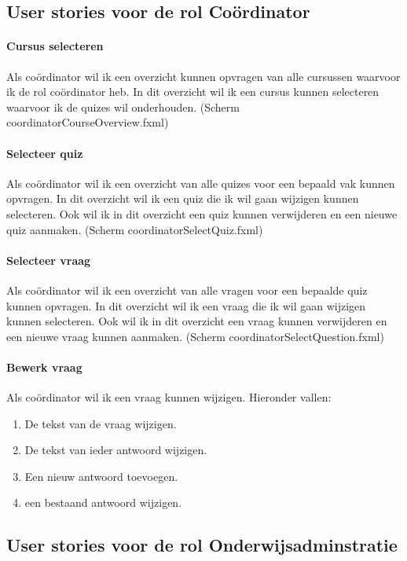 \documentclass[11pt, a4paper]{article}
\begin{document}
\subsection{User stories voor de rol Co\"ordinator}

\paragraph{Cursus selecteren} Als co\"ordinator wil ik een overzicht kunnen opvragen van alle cursussen waarvoor ik de rol co\"ordinator heb.
In dit overzicht wil ik een cursus kunnen selecteren waarvoor ik de quizes wil onderhouden. (Scherm coordinatorCourseOverview.fxml)

\paragraph{Selecteer quiz} Als co\"ordinator wil ik een overzicht van alle quizes voor een bepaald vak kunnen opvragen.
In dit overzicht wil ik een quiz die ik wil gaan wijzigen kunnen selecteren.
Ook wil ik in dit overzicht een quiz kunnen verwijderen en een nieuwe quiz aanmaken. (Scherm coordinatorSelectQuiz.fxml)

\paragraph{Selecteer vraag} Als co\"ordinator wil ik een overzicht van alle vragen voor een bepaalde quiz kunnen opvragen.
In dit overzicht wil ik een vraag die ik wil gaan wijzigen kunnen selecteren.
Ook wil ik in dit overzicht een vraag kunnen verwijderen en een nieuwe vraag kunnen aanmaken. (Scherm coordinatorSelectQuestion.fxml)

\paragraph{Bewerk vraag} Als co\"ordinator wil ik een vraag kunnen wijzigen. Hieronder vallen:
\begin{enumerate}
\item De tekst van de vraag wijzigen.
\item De tekst van ieder antwoord wijzigen.
\item Een nieuw antwoord toevoegen.
\item een bestaand antwoord wijzigen.
\end{enumerate}



\subsection{User stories voor de rol Onderwijsadminstratie}
\end{document}
